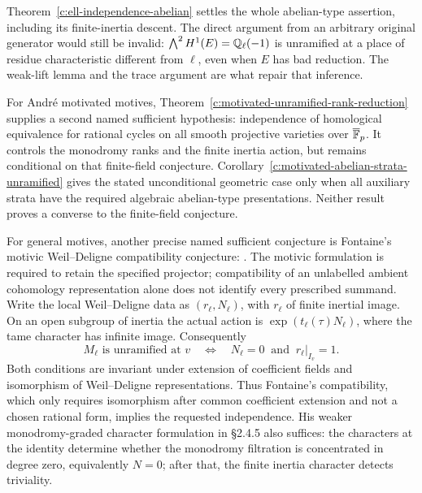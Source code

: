 \begin{remark}
\label{c:ell-independence-gate}
Theorem~\ref{c:ell-independence-abelian} settles the whole abelian-type assertion, including its finite-inertia descent. The direct argument from an arbitrary original generator would still be invalid: $\bigwedge^2H^1(E)=\mathbb Q_\ell(-1)$ is unramified at a place of residue characteristic different from $\ell$, even when $E$ has bad reduction. The weak-lift lemma and the trace argument are what repair that inference.

For Andr\'e motivated motives, Theorem~\ref{c:motivated-unramified-rank-reduction} supplies a second named sufficient hypothesis: independence of homological equivalence for rational cycles on all smooth projective varieties over $\overline{\mathbb F}_p$. It controls the monodromy ranks and the finite inertia action, but remains conditional on that finite-field conjecture. Corollary~\ref{c:motivated-abelian-strata-unramified} gives the stated unconditional geometric case only when all auxiliary strata have the required algebraic abelian-type presentations. Neither result proves a converse to the finite-field conjecture.

For general motives, another precise named sufficient conjecture is Fontaine's motivic Weil--Deligne compatibility conjecture: \citet[\S2.4.3, Conjecture $C_{\mathrm{WD}}(X,m)$, p.~342, and its motivic formulation in \S2.4.7, pp.~344--345]{c_fontaine1994pst}. The motivic formulation is required to retain the specified projector; compatibility of an unlabelled ambient cohomology representation alone does not identify every prescribed summand. Write the local Weil--Deligne data as $(r_\ell,N_\ell)$, with $r_\ell$ of finite inertial image. On an open subgroup of inertia the actual action is $\exp(t_\ell(\tau)N_\ell)$, where the tame character has infinite image. Consequently
\[
 M_\ell\text{ is unramified at }v
 \quad\Longleftrightarrow\quad
 N_\ell=0\ \text{ and }\ r_\ell|_{I_v}=1.
\]
Both conditions are invariant under extension of coefficient fields and isomorphism of Weil--Deligne representations. Thus Fontaine's compatibility, which only requires isomorphism after common coefficient extension and not a chosen rational form, implies the requested independence. His weaker monodromy-graded character formulation in \S2.4.5 also suffices: the characters at the identity determine whether the monodromy filtration is concentrated in degree zero, equivalently $N=0$; after that, the finite inertia character detects triviality.


\end{remark}
